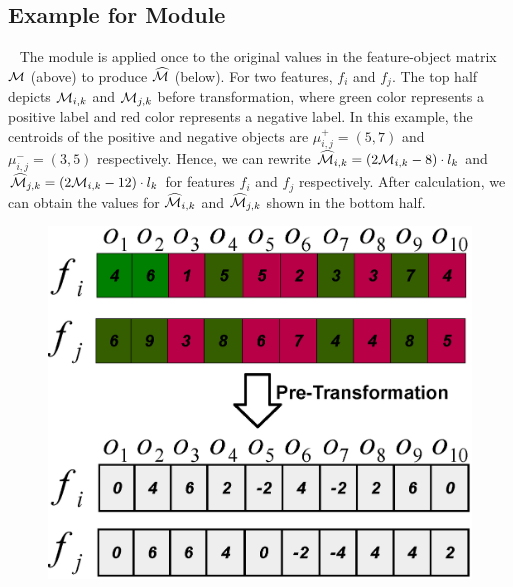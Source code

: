 \subsection{Example for \trans Module}~\label{appF:transform}
The \trans module is applied once to the original values in the feature-object matrix ${\mathcal{M}}$ (above) to produce $\widehat{{\mathcal{M}}}$ (below). For two features, $f_i$ and $f_j$. The top half depicts ${\mathcal{M}}_{i,k}$ and ${\mathcal{M}}_{j,k}$ before transformation, where green color represents a positive label and red color represents a negative label. In this example, the centroids of the positive and negative objects are $\mu_{i,j}^+=(5,7)$ and $\mu_{i,j}^-=(3,5)$ respectively. Hence, we can rewrite $\widehat{{\mathcal{M}}}_{i,k} = (2{\mathcal{M}}_{i,k}-8)\cdot l_k$ and $\widehat{{\mathcal{M}}}_{j,k} = (2{\mathcal{M}}_{i,k}-12)\cdot l_k$ for features $f_i$ and $f_j$ respectively. After calculation, we can obtain the values for $\widehat{{\mathcal{M}}}_{i,k}$ and $\widehat{{\mathcal{M}}}_{j,k}$ shown in the bottom half.
\begin{figure}[!htb]
\centering %
\vspace{-5mm}
\includegraphics[width=.235\textwidth]{fig/transformation.eps}
\vspace{-8mm}
\label{fig:trans_term}
\end{figure}


